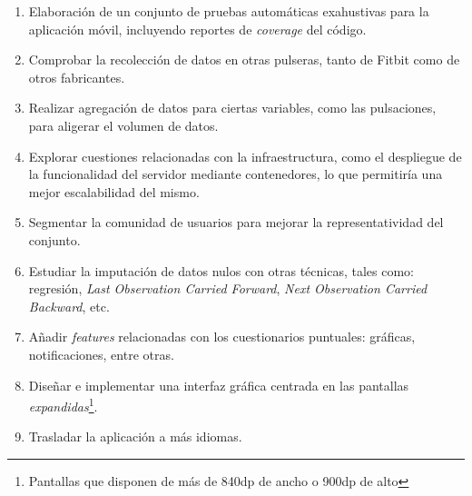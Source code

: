     \begin{enumerate}
        \item Elaboración de un conjunto de pruebas automáticas exahustivas para la aplicación móvil, incluyendo reportes de \textit{coverage} del código.
        \item Comprobar la recolección de datos en otras pulseras, tanto de Fitbit como de otros fabricantes.
        \item Realizar agregación de datos para ciertas variables, como las pulsaciones, para aligerar el volumen de datos.
        \item Explorar cuestiones relacionadas con la infraestructura, como el despliegue de la funcionalidad del servidor mediante contenedores, lo que permitiría una mejor escalabilidad del mismo.
        \item Segmentar la comunidad de usuarios para mejorar la representatividad del conjunto.
        \item Estudiar la imputación de datos nulos con otras técnicas, tales como: regresión, \textit{Last Observation Carried Forward}, \textit{Next Observation Carried Backward}, etc. \cite{gupta_null_nodate}
        \item Añadir \textit{features} relacionadas con los cuestionarios puntuales: gráficas, notificaciones, entre otras.
        \item Diseñar e implementar una interfaz gráfica centrada en las pantallas \textit{expandidas}\footnote{Pantallas 
        que disponen de más de 840dp de ancho o 900dp de alto}.
        \item Trasladar la aplicación a más idiomas.
    \end{enumerate}
